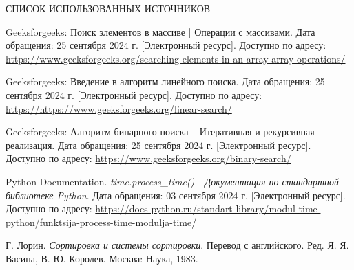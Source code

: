 \begin{center}
    \MakeUppercase{\large Список использованных источников}
\end{center}

\renewcommand{\refname}{}
\vspace{-11mm}

\begin{thebibliography}{9}
    
     Geeksforgeeks: Поиск элементов в массиве | Операции с массивами. Дата обращения: 25 сентября 2024 г. [Электронный ресурс]. Доступно по адресу: \url{https://www.geeksforgeeks.org/searching-elements-in-an-array-array-operations/}
    
     Geeksforgeeks: Введение в алгоритм линейного поиска. Дата обращения: 25 сентября 2024 г. [Электронный ресурс]. Доступно по адресу: \url{https://https://www.geeksforgeeks.org/linear-search/}
    
     Geeksforgeeks: Алгоритм бинарного поиска – Итеративная и рекурсивная реализация. Дата обращения: 25 сентября 2024 г. [Электронный ресурс]. Доступно по адресу: \url{https://www.geeksforgeeks.org/binary-search/}
    
     Python Documentation. \textit{time.process\_time() - Документация по стандартной библиотеке Python}. Дата обращения: 03 сентября 2024 г. [Электронный ресурс]. Доступно по адресу: \url{https://docs-python.ru/standart-library/modul-time-python/funktsija-process-time-modulja-time/}
    
     Г. Лорин. \textit{Сортировка и системы сортировки}. Перевод с английского. Ред. Я. Я. Васина, В. Ю. Королев. Москва: Наука, 1983.
  
\end{thebibliography}